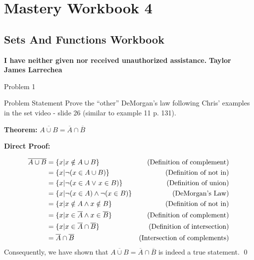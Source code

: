 \clearpage
\chapter{Mastery Workbook 4}

\section{Sets And Functions Workbook}


\begin{center}
    \Large{\textbf{I have neither given nor received unauthorized assistance.}}
    \large{\textbf{Taylor James Larrechea}}
\end{center}

\begin{problem}{Problem 1}
    \begin{statement}{Problem Statement}
        Prove the “other” DeMorgan’s law following Chris’ examples in the set video - slide 26 (similar to example 11 p. 131).
    \end{statement}

    \begin{highlight}[Solution]
        \noindent \textbf{Theorem:} $\overline{A \cup B} = \overline{A} \cap \overline{B}$ \vspace*{1em}

        \noindent \textbf{Direct Proof:}

        \begin{align*}
            \overline{A \cup B} & = \{x | x \notin A \cup B \} & \text{(Definition of complement)} \\
            & = \{x | \neg (x \in A \cup B) \} & \text{(Definition of not in)} \\
            & = \{x | \neg (x \in A \vee \hspace*{1pt} x \in B)\} & \text{(Definition of union)} \\
            & = \{x | \neg (x \in A) \wedge \neg (x \in B) \} & \text{(DeMorgan’s Law)} \\
            & = \{x | x \notin A \wedge x \notin B \} & \text{(Definition of not in)} \\
            & = \{x | x \in \overline{A} \wedge x \in \overline{B} \} & \text{(Definition of complement)} \\
            & = \{x | x \in \overline{A} \cap \overline{B} \} & \text{(Definition of intersection)} \\
            & = \overline{A} \cap \overline{B} & \text{(Intersection of complements)}
        \end{align*}
        Consequently, we have shown that $\overline{A \cup B} = \overline{A} \cap \overline{B}$ is indeed a true statement. \qed
    \end{highlight}
\end{problem}

